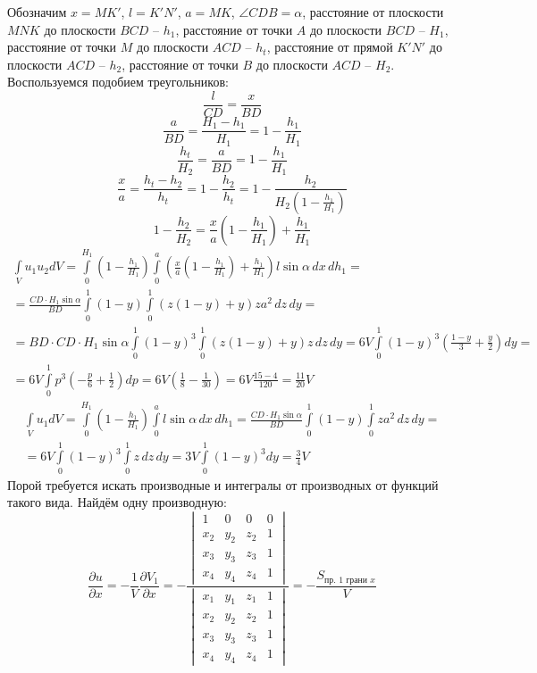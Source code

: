 Обозначим $x = MK'$, $l = K'N'$, $a = MK$, $\angle CDB = \alpha$, расстояние от плоскости $MNK$ до плоскости $BCD$ -- $h_1$, расстояние от точки $A$ до плоскости $BCD$ -- $H_1$, расстояние от точки $M$ до плоскости $ACD$ -- $h_t$, расстояние от прямой $K'N'$ до плоскости $ACD$ -- $h_2$, расстояние от точки $B$ до плоскости $ACD$ -- $H_2$. Воспользуемся подобием треугольников:
\[
	\frac{l}{CD} = \frac{x}{BD}
\]
\[
	\frac{a}{BD} = \frac{H_1 - h_1}{H_1} = 1 - \frac{h_1}{H_1}
\]
\[
	\frac{h_t}{H_2} = \frac{a}{BD} = 1 - \frac{h_1}{H_1}
\]
\[
	\frac{x}{a} = \frac{h_t - h_2}{h_t} = 1 - \frac{h_2}{h_t} =
	1 - \frac{h_2}{H_2\left(1 - \frac{h_1}{H_1}\right)}
\]
\[
	1 - \frac{h_2}{H_2} = \frac{x}{a} \left(1 - \frac{h_1}{H_1}\right) + \frac{h_1}{H_1}
\]
\[
	\boxed{
	\begin{gathered}
	\int\limits_V u_1 u_2 dV = 
	\int\limits_{0}^{H_1} \left(1 - \frac{h_1}{H_1}\right) \int\limits_{0}^{a}  \left(\frac{x}{a} \left(1 - \frac{h_1}{H_1}\right) + \frac{h_1}{H_1}\right) l \sin \alpha \, dx \, dh_1 
	= \\ =
	\frac{CD\cdot H_1 \sin \alpha}{BD}
	\int\limits_{0}^{1} (1 - y) \int\limits_{0}^{1}  \left(z \left(1 - y\right) + y\right) z a^2 \, dz \, dy
	= \\ =
	BD\cdot CD\cdot H_1 \sin \alpha
	\int\limits_{0}^{1} (1 - y)^3 \int\limits_{0}^{1}  \left(z \left(1 - y\right) + y\right) z \, dz \, dy
	= 
	6 V
	\int\limits_{0}^{1} (1 - y)^3 \left(\frac{1 - y}{3} + \frac{y}{2}\right) dy
	= \\ =
	6 V
	\int\limits_{0}^{1} p^3 \left(- \frac{p}{6} + \frac{1}{2}\right) dp
	=
	6 V \left(\frac{1}{8} - \frac{1}{30}\right) = 6 V \frac{15 - 4}{120} = \frac{11}{20} V
	\end{gathered}
	}
\]
\[
\boxed{
	\begin{gathered}
	\int\limits_V u_1 dV = 
	\int\limits_{0}^{H_1} \left(1 - \frac{h_1}{H_1}\right) \int\limits_{0}^{a}  l \sin \alpha \, dx \, dh_1 
	=
	\frac{CD\cdot H_1 \sin \alpha}{BD}
	\int\limits_{0}^{1} (1 - y) \int\limits_{0}^{1} z a^2 \, dz \, dy
	= \\ =
	6 V
	\int\limits_{0}^{1} (1 - y)^3 \int\limits_{0}^{1} z \, dz \, dy
	= 
	3 V
	\int\limits_{0}^{1} (1 - y)^3 dy
	=
	\frac{3}{4} V
	\end{gathered}
}
\]
Порой требуется искать производные и интегралы от производных от функций такого вида. Найдём одну производную:
\[
	\frac{\partial u}{\partial x} = - \frac{1}{V} \frac{\partial V_1}{\partial x}
	=
	- \frac{\begin{vmatrix}
	1   & 0   & 0   & 0 \\
	x_2 & y_2 & z_2 & 1 \\
	x_3 & y_3 & z_3 & 1 \\
	x_4 & y_4 & z_4 & 1
	\end{vmatrix}}{\begin{vmatrix}
	x_1 & y_1 & z_1 & 1 \\
	x_2 & y_2 & z_2 & 1 \\
	x_3 & y_3 & z_3 & 1 \\
	x_4 & y_4 & z_4 & 1
	\end{vmatrix}}
	=
	- \frac{S_{\text{пр. 1 грани }x}}{V}
\]